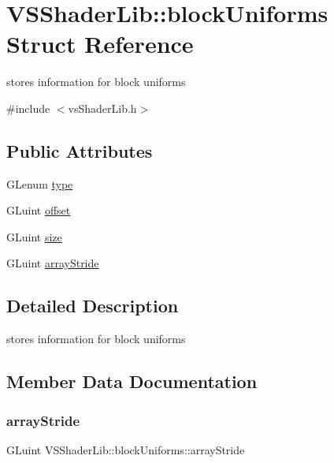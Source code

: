 \hypertarget{struct_v_s_shader_lib_1_1block_uniforms}{}\section{V\+S\+Shader\+Lib\+:\+:block\+Uniforms Struct Reference}
\label{struct_v_s_shader_lib_1_1block_uniforms}


stores information for block uniforms  




{\ttfamily \#include $<$vs\+Shader\+Lib.\+h$>$}

\subsection*{Public Attributes}
\begin{DoxyCompactItemize}
\item 
G\+Lenum \hyperlink{struct_v_s_shader_lib_1_1block_uniforms_aa7fea6a1df08d26149653874b42cc0b7}{type}
\item 
G\+Luint \hyperlink{struct_v_s_shader_lib_1_1block_uniforms_a5f981214db7220f3558119d3a1db0278}{offset}
\item 
G\+Luint \hyperlink{struct_v_s_shader_lib_1_1block_uniforms_a252c695efa6bda9a954e597766fdaa70}{size}
\item 
G\+Luint \hyperlink{struct_v_s_shader_lib_1_1block_uniforms_aeb76274b0260eece999a4307b06338ef}{array\+Stride}
\end{DoxyCompactItemize}


\subsection{Detailed Description}
stores information for block uniforms 

\subsection{Member Data Documentation}
\mbox{\label{struct_v_s_shader_lib_1_1block_uniforms_aeb76274b0260eece999a4307b06338ef}} 
\subsubsection{\texorpdfstring{array\+Stride}{arrayStride}}
{\footnotesize\ttfamily G\+Luint V\+S\+Shader\+Lib\+::block\+Uniforms\+::array\+Stride}

